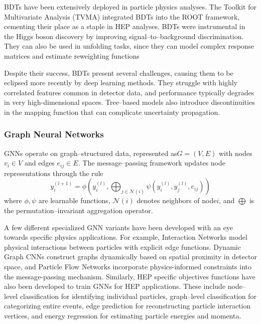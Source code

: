         BDTs have been extensively deployed in particle physics analyses.
        The Toolkit for Multivariate Analysis (TVMA) integrated BDTs into the ROOT framework, cementing their place as a staple in HEP analyses.
        BDTs were instrumental in the Higgs boson discovery by improving signal--to--background discrimination.
        They can also be used in unfolding tasks, since they can model complex response matrices and estimate reweighting functions
        
        Despite their success, BDTs present several challenges, causing them to be eclipsed more recently by deep learning methods.
        They struggle with highly correlated features common in detector data, and performance typically degrades in very high-dimensional spaces.
        Tree--based models also introduce discontinuities in the mapping function that can complicate uncertainty propagation.

    \subsubsection{Graph Neural Networks}
        GNNs operate on graph--structured data, represented as\(G = (V, E)\)
        with nodes \(v_i \in V\) and edges \(e_{ij} \in E\).
        The message--passing framework updates node representations through the rule
        \begin{equation}
            y_i^{(l+1)} = \phi\left(y_i^{(l)}, \bigoplus_{j \in \mathcal{N}(i)} \psi(y_i^{(l)}, y_j^{(l)}, e_{ij})\right)
        \end{equation}
        where \(\phi, \psi\) are learnable functions, \(\mathcal{N}(i)\) denotes neighbors of node\(i\), and \(\bigoplus\) is the permutation--invariant aggregation operator.

        A few different specialized GNN variants have been developed with an eye towards specific physics applications.
        For example,
        Interaction Networks model physical interactions between particles with explicit edge functions.
        Dynamic Graph CNNs construct graphs dynamically based on spatial proximity in detector space, and
        Particle Flow Networks incorporate physics-informed constraints into the message-passing mechanism.
        Similarly, HEP specific objectives functions have also been developed to train GNNs for HEP applications. 
        These include node--level classification for identifying individual particles,
        graph--level classification for categorizing entire events,
        edge prediction for reconstructing particle interaction vertices,
        and energy regression for estimating particle energies and momenta.

